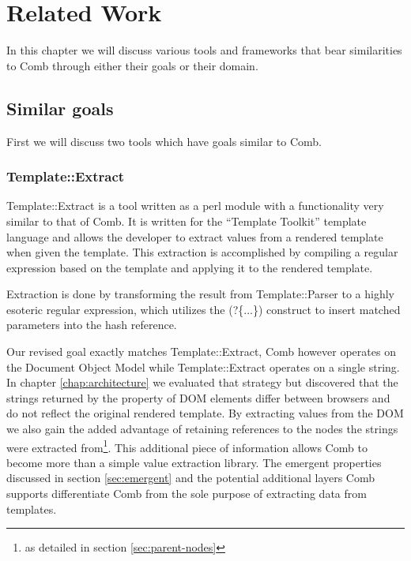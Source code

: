 \documentclass[thesis.tex]{subfiles}
\begin{document}
\chapter{Related Work}
\label{chap:related}
In this chapter we will discuss various tools and frameworks that bear
similarities to Comb through either their goals or their domain.


\section{Similar goals}
First we will discuss two tools which have goals similar to Comb.

\subsection{Template::Extract}
Template::Extract\cite{TPLEXTRACT} is a tool written as a perl module with a
functionality very similar to that of Comb.
It is written for the ``Template Toolkit'' template language and allows the
developer to extract values from a rendered template when given the template.
This extraction is accomplished by compiling a regular expression based on the
template and applying it to the rendered template.

\begin{citequote}{\cite{TPLEXTRACT}}
Extraction is done by transforming the result from Template::Parser to a highly
esoteric regular expression, which utilizes the (?\{...\}) construct to insert
matched parameters into the hash reference.
\end{citequote}

Our revised goal exactly matches Template::Extract, Comb however operates on the
Document Object Model while Template::Extract operates on a single string.
In chapter \ref{chap:architecture} we evaluated that strategy but discovered
that the strings returned by the  property of DOM elements
differ between browsers and do not reflect the original rendered template.
By extracting values from the DOM we also gain the added advantage
of retaining references to the nodes the strings were extracted
from\footnote{as detailed in section \ref{sec:parent-nodes}}.
This additional piece of information allows Comb to become more than a simple
value extraction library. The emergent properties discussed in
section \ref{sec:emergent} and the potential additional layers Comb supports
differentiate Comb from the sole purpose of extracting data from templates.
\end{document}
